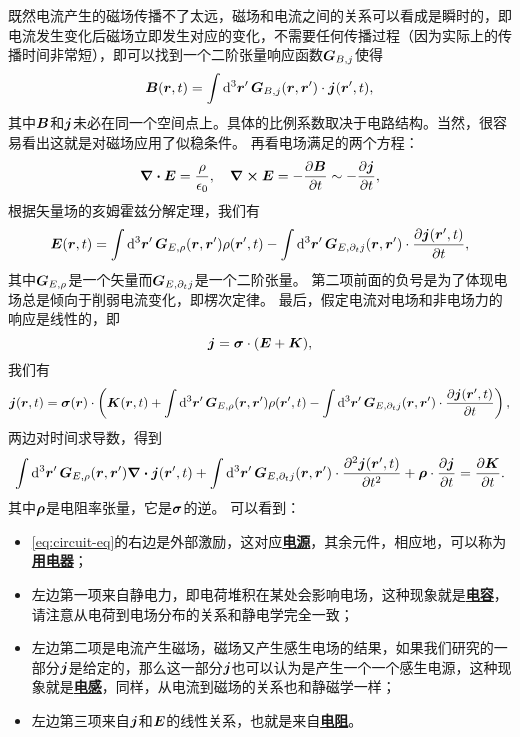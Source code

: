 \documentclass[UTF8, a4paper]{ctexart}
\newcommand*{\concept}[1]{\underline{\textbf{#1}}}
\begin{document}
既然电流产生的磁场传播不了太远，磁场和电流之间的关系可以看成是瞬时的，即电流发生变化后磁场立即发生对应的变化，不需要任何传播过程（因为实际上的传播时间非常短），即可以找到一个二阶张量响应函数$\vb*{G}_{B, j}$使得
\[
    \vb*{B}(\vb*{r}, t) = \int \dd[3]{\vb*{r}'} \vb*{G}_{B, j}(\vb*{r}, \vb*{r}') \cdot \vb*{j}(\vb*{r}', t),
\]
其中$\vb*{B}$和$\vb*{j}$未必在同一个空间点上。具体的比例系数取决于电路结构。当然，很容易看出这就是对磁场应用了似稳条件。
再看电场满足的两个方程：
\[
    \div{\vb*{E}} = \frac{\rho}{\epsilon_0}, \quad \curl{\vb*{E}} = - \pdv{\vb*{B}}{t} \sim - \pdv{\vb*{j}}{t},
\]
根据矢量场的亥姆霍兹分解定理，我们有
\[
    \vb*{E}(\vb*{r}, t) = \int \dd[3]{\vb*{r}'} \vb*{G}_{E, \rho}(\vb*{r}, \vb*{r}') \rho(\vb*{r}', t) - \int \dd[3]{\vb*{r}'} \vb*{G}_{E, \partial_t j}(\vb*{r}, \vb*{r}') \cdot \pdv{\vb*{j}(\vb*{r}', t)}{t} ,
\]
其中$\vb*{G}_{E, \rho}$是一个矢量而$\vb*{G}_{E, \partial_t j}$是一个二阶张量。
第二项前面的负号是为了体现电场总是倾向于削弱电流变化，即楞次定律。
最后，假定电流对电场和非电场力的响应是线性的，即
\begin{equation}
    \vb*{j} = \vb*{\sigma} \cdot (\vb*{E} + \vb*{K}),
\end{equation}
我们有
\[
    \vb*{j}(\vb*{r}, t) = \vb*{\sigma}(\vb*{r}) \cdot \left( \vb*{K}(\vb*{r}, t) + \int \dd[3]{\vb*{r}'} \vb*{G}_{E, \rho}(\vb*{r}, \vb*{r}') \rho(\vb*{r}', t) - \int \dd[3]{\vb*{r}'} \vb*{G}_{E, \partial_t j}(\vb*{r}, \vb*{r}') \cdot \pdv{\vb*{j}(\vb*{r}', t)}{t} \right),
\]
两边对时间求导数，得到
\begin{equation}
    \int \dd[3]{\vb*{r}'} \vb*{G}_{E, \rho}(\vb*{r}, \vb*{r}') \div{\vb*{j}}(\vb*{r}', t) + \int \dd[3]{\vb*{r}'} \vb*{G}_{E, \partial_t j}(\vb*{r}, \vb*{r}') \cdot \pdv[2]{\vb*{j}(\vb*{r}', t)}{t} + \vb*{\rho} \cdot \pdv{\vb*{j}}{t} = \pdv{\vb*{K}}{t}.
    \label{eq:circuit-eq}
\end{equation}
其中$\vb*{\rho}$是电阻率张量，它是$\vb*{\sigma}$的逆。
可以看到：
\begin{itemize}
    \item \eqref{eq:circuit-eq}的右边是外部激励，这对应\concept{电源}，其余元件，相应地，可以称为\concept{用电器}；
    \item 左边第一项来自静电力，即电荷堆积在某处会影响电场，这种现象就是\concept{电容}，请注意从电荷到电场分布的关系和静电学完全一致；
    \item 左边第二项是电流产生磁场，磁场又产生感生电场的结果，如果我们研究的一部分$\vb*{j}$是给定的，那么这一部分$\vb*{j}$也可以认为是产生一个一个感生电源，这种现象就是\concept{电感}，同样，从电流到磁场的关系也和静磁学一样；
    \item 左边第三项来自$\vb*{j}$和$\vb*{E}$的线性关系，也就是来自\concept{电阻}。
\end{itemize}
\end{document}
